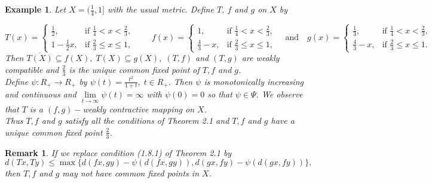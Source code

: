 \documentclass[11]{article}
\newtheorem{remark}[definition]{Remark}
\newtheorem{example}[definition]{Example}
\numberwithin{equation}{definition}
\begin{document}
\begin{example}
Let $X=(\frac{1}{4},1]$ with the usual metric. Define $T$, $f$ and $g$ on $X$ by

\[
T(x)=
\begin{cases}
\frac{1}{2}, & \text{if } \frac{1}{4}<x<\frac{2}{3},\\
1-\frac{1}{2}x, & \text{if } \frac{2}{3}\le x\le 1,
\end{cases}
\qquad
f(x)=
\begin{cases}
1, & \text{if } \frac{1}{4}<x<\frac{2}{3},\\
\frac{4}{3}-x, & \text{if } \frac{2}{3}\le x\le 1,
\end{cases}
\quad \text{and} \quad
g(x)=
\begin{cases}
\frac{1}{3}, & \text{if } \frac{1}{4}<x<\frac{2}{3},\\
\frac{4}{3}-x, & \text{if } \frac{2}{3}\le x\le 1.
\end{cases}
\]
Then $\overline{T(X)}\subseteq f(X),\;T(X)\subseteq g(X),\;(T,f)$ and $(T,g)$ are weakly compatible and $\frac{2}{3}$ is the unique common fixed point of $T,f$ and $g$.\\
Define $\psi:R_{+}\to R_{+}$ by $\psi(t)=\frac{t^{2}}{1+t},\;t\in R_{+}.$ Then $\psi$ is monotonically increasing and continuous and $\lim\limits_{t\to\infty}\psi(t)=\infty$ with $\psi(0)=0$ so that $\psi\in\Psi$. We observe that $T$ is a $(f,g)-$weakly contractive mapping on $X$.\\
Thus $T,f$ and $g$ satisfy all the conditions of Theorem 2.1 and $T,f$ and $g$ have a unique common fixed point $\frac{2}{3}$.
\end{example}

\begin{remark}
If we replace condition (1.8.1) of Theorem 2.1 by
\begin{equation}
d(Tx,Ty)\leq\max\{d(fx,gy)-\psi(d(fx,gy)),d(gx,fy)-\psi(d(gx,fy))\},
\end{equation}
then $T,f$ and $g$ may not have common fixed points in $X$.
\end{remark}
\end{document}
